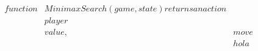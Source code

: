 \documentclass[preview]{standalone}
\begin{document}
\begin{align*}
function &MinimaxSearch(game, state) returns an action \\&player \\& value, &move \\&&hola
\end{align*}
\end{document}
